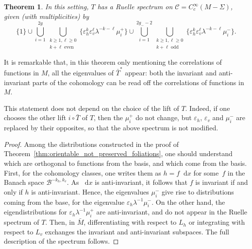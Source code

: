 \documentclass[JEP,XML,SOM,Unicode]{cedram}
\newcommand{\boC}{\mathcal{C}}
\newcommand{\boB}{\mathcal{B}}
\newcommand{\dd}{\mathop{}\!\mathrm{d}}
\let\epsilon\varepsilon
\newtheorem{thm}{Theorem}[section]
\theoremstyle{definition}
\numberwithin{equation}{section}
\begin{document}
\begin{thm}
\label{thm:ruelle_spectrum_nonorientable} In this setting, $T$ has a Ruelle
spectrum on $\boC = C^\infty_c(M-\Sigma)$, given (with multiplicities) by
\begin{equation*}
\{1\} \cup
\bigcup_{i=1}^{2g} \bigcup_{\substack{k \geq 1, \ell \geq 0\\k + \ell \text{ even}}}
\{\epsilon_h^k \epsilon_v^\ell \lambda^{-k-\ell}\mu_i^+\}
\cup
\bigcup_{i=1}^{2g_- -2} \bigcup_{\substack{k \geq 1, \ell \geq 0\\k + \ell \text{ odd}}}
\{\epsilon_h^k \epsilon_v^\ell \lambda^{-k-\ell}\mu_i^-\}.
\end{equation*}
\end{thm}
It is remarkable that, in this theorem only mentioning the correlations of
functions in $M$, all the eigenvalues of $\bar T^*$ appear: both the
invariant and anti-invariant parts of the cohomology can be read off the
correlations of functions in $M$.

This statement does not depend on the choice of the lift of $T$. Indeed, if
one chooses the other lift $i\circ \bar T$ of $T$, then the $\mu_i^+$ do not
change, but $\epsilon_h$, $\epsilon_v$ and $\mu_i^-$ are replaced by their
opposites, so that the above spectrum is not modified.
\begin{proof}
Among the distributions constructed in the proof of
Theorem~\ref{thm:orientable_not_preserved_foliations}, one should understand
which are orthogonal to functions from the basis, and which come from the
basis. First, for the cohomology classes, one writes them as $h = f \dd x$
for some~$f$ in the Banach space $\boB^{-k_h, k_v}$. As $\dd x$ is
anti-invariant, it follows that $f$ is invariant if and only if $h$ is
anti-invariant. Hence, the eigenvalues $\mu_i^-$ give rise to distributions
coming from the base, for the eigenvalue $\epsilon_h \lambda^{-1} \mu_i^-$.
On the other hand, the eigendistributions for $\epsilon_h
\lambda^{-1}\mu_i^+$ are anti-invariant, and do not appear in the Ruelle
spectrum of $T$. Then, in $\bar M$, differentiating with respect to $L_h$ or
integrating with respect to $L_v$ exchanges the invariant and anti-invariant
subspaces. The full description of the spectrum follows.
\end{proof}
\end{document}
